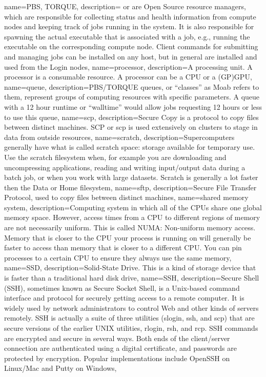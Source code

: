 {
  name={PBS, TORQUE},
  description={ or  are Open Source resource managers, which are responsible for collecting status and health information from compute nodes and keeping track of jobs running in the system. It is also responsible for spawning the actual executable that is associated with a job, e.g., running the executable on the corresponding compute node. Client commands for submitting and managing jobs can be installed on any host, but in general are installed and used from the Login nodes},
}
{
  name={processor},
  description={A processing unit. A processor is a consumable resource. A processor can be a CPU or a (GP)GPU},
}
{
  name={queue},
  description={PBS/TORQUE queues, or ``classes'' as Moab refers to them, represent groups of computing resources with specific parameters. A queue with a 12 hour runtime or ``walltime'' would allow jobs requesting 12 hours or less to use this queue},
}
{
  name={scp},
  description={Secure Copy is a protocol to copy files between distinct machines. SCP or scp is used extensively on \hpc clusters to stage in data from outside resources},
}
{
  name={scratch},
  description={Supercomputers generally have what is called scratch space: storage available for temporary use. Use the scratch filesystem when, for example you are downloading and uncompressing applications, reading and writing input/output data during a batch job, or when you work with large datasets. Scratch is generally a lot faster then the Data or Home filesystem},
}
{
  name={sftp},
  description={Secure File Transfer Protocol, used to copy files between distinct machines},
}
{
  name={shared memory system},
  description={Computing system in which all of the CPUs share one global memory space. However, access times from a CPU to different regions of memory are not necessarily uniform. This is called NUMA: Non-uniform memory access. Memory that is closer to the CPU your process is running on will generally be faster to access than memory that is closer to a different CPU. You can pin processes to a certain CPU to ensure they always use the same memory},
}
{
  name={SSD},
  description={Solid-State Drive. This is a kind of storage device that is faster than a traditional hard disk drive},
}
{
  name={SSH},
  description={Secure Shell (SSH), sometimes known as Secure Socket Shell, is a Unix-based command interface and protocol for securely getting access to a remote computer. It is widely used by network administrators to control Web and other kinds of servers remotely. SSH is actually a suite of three utilities (slogin, ssh, and scp) that are secure versions of the earlier UNIX utilities, rlogin, rsh, and rcp. SSH commands are encrypted and secure in several ways. Both ends of the client/server connection are authenticated using a digital certificate, and passwords are protected by encryption. Popular implementations include OpenSSH on Linux/Mac and Putty on Windows},
}
